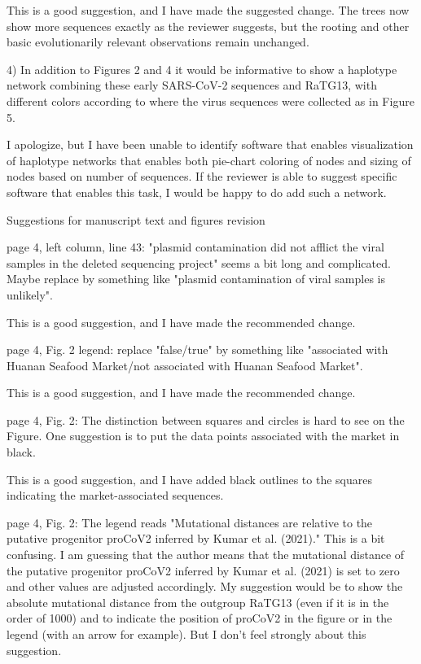 \documentclass[11pt, oneside]{article}   	%
\newcommand{\response}[1]{{\color{black}#1}}
\begin{document}
\response{This is a good suggestion, and I have made the suggested change. The trees now show more sequences exactly as the reviewer suggests, but the rooting and other basic evolutionarily relevant observations remain unchanged.}

4) In addition to Figures 2 and 4 it would be informative to show a haplotype network combining these early SARS-CoV-2 sequences and RaTG13, with different colors according to where the virus sequences were collected as in Figure 5.

\response{I apologize, but I have been unable to identify software that enables visualization of haplotype networks that enables both pie-chart coloring of nodes and sizing of nodes based on number of sequences.
If the reviewer is able to suggest specific software that enables this task, I would be happy to do add such a network.
} 

Suggestions for manuscript text and figures revision

page 4, left column, line 43: "plasmid contamination did not afflict the viral samples in the deleted sequencing project" seems a bit long and complicated. Maybe replace by something like "plasmid contamination of viral samples is unlikely".

\response{This is a good suggestion, and I have made the recommended change.}

page 4, Fig. 2 legend: replace "false/true" by something like "associated with Huanan Seafood Market/not associated with Huanan Seafood Market".

\response{This is a good suggestion, and I have made the recommended change.}

page 4, Fig. 2: The distinction between squares and circles is hard to see on the Figure. One suggestion is to put the data points associated with the market in black.

\response{This is a good suggestion, and I have added black outlines to the squares indicating the market-associated sequences.}

page 4, Fig. 2: The legend reads "Mutational distances are relative to the putative progenitor proCoV2 inferred by Kumar et al. (2021)." This is a bit confusing. I am guessing that the author means that the mutational distance of the putative progenitor proCoV2 inferred by Kumar et al. (2021) is set to zero and other values are adjusted accordingly. My suggestion would be to show the absolute mutational distance from the outgroup RaTG13 (even if it is in the order of 1000) and to indicate the position of proCoV2 in the figure or in the legend (with an arrow for example). But I don't feel strongly about this suggestion.
\end{document}
